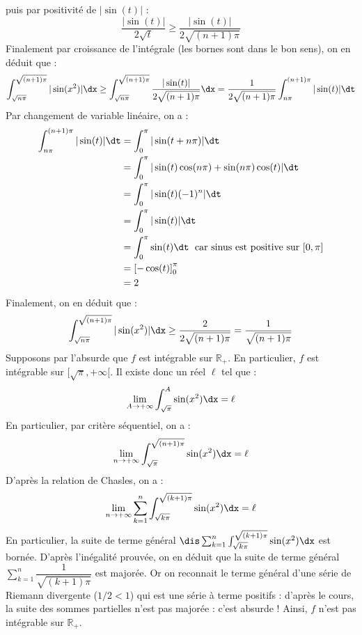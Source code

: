 \documentclass[a4paper,10pt]{report}
\begin{document}
\begin{enumerate}
puis par positivité de $\vert \sin(t) \vert$ :
$$ \dfrac{\vert \sin(t) \vert}{2 \sqrt{t}} \geq \dfrac{\vert \sin(t) \vert}{2 \sqrt{(n+1)\pi}}$$
Finalement par croissance de l'intégrale (les bornes sont dans le bon sens), on en déduit que :
$$ \int_{\sqrt{n \pi}}^{\sqrt{(n+1)\pi}} \vert \sin(x^2) \vert \dx \geq \int_{\sqrt{n \pi}}^{\sqrt{(n+1)\pi}} \dfrac{\vert \sin(t) \vert}{2 \sqrt{(n+1)\pi}} \dx = \dfrac{1}{2 \sqrt{(n+1)\pi}} \int_{n\pi}^{(n+1) \pi} \vert \sin(t) \vert \dt$$
Par changement de variable linéaire, on a : 
\begin{align*}
 \int_{n\pi}^{(n+1) \pi} \vert \sin(t) \vert \dt & =  \int_{0}^{\pi} \vert \sin(t+n \pi) \vert \dt\\
 & = \int_{0}^{\pi} \vert \sin(t) \cos(n \pi)+ \sin(n\pi)\cos(t) \vert \dt \\
 & =  \int_{0}^{\pi} \vert \sin(t) (-1)^n  \vert \dt \\
 & = \int_{0}^{\pi} \vert \sin(t)  \vert \dt \\
 & = \int_{0}^{\pi}  \sin(t)   \dt  \; \hbox{ car sinus est positive sur } [0,\pi] \\
 & = \left[- \cos(t) \right]_0^{\pi} \\
 & = 2
\end{align*}
Finalement, on en déduit que :
$$ \int_{\sqrt{n \pi}}^{\sqrt{(n+1)\pi}} \vert \sin(x^2) \vert \dx \geq \dfrac{2}{2 \sqrt{(n+1)\pi}} = \dfrac{1}{\sqrt{(n+1)\pi}}$$
Supposons par l'absurde que $f$ est intégrable sur $\mathbb{R}_+$. En particulier, $f$ est intégrable sur $[\sqrt{\pi}, + \infty[$. Il existe donc un réel $\ell$ tel que :
 $$ \lim_{A \rightarrow + \infty} \int_{\sqrt{\pi}}^A \sin(x^2) \dx = \ell$$
 En particulier, par critère séquentiel, on a :
 $$ \lim_{n \rightarrow + \infty} \int_{\sqrt{\pi}}^{\sqrt{(n+1)\pi}} \sin(x^2) \dx = \ell$$
 D'après la relation de Chasles, on a :
 $$ \lim_{n \rightarrow + \infty} \sum_{k=1}^n \int_{\sqrt{k\pi}}^{\sqrt{(k+1)\pi}} \sin(x^2) \dx = \ell$$
 En particulier, la suite de terme général $\dis \sum_{k=1}^n \int_{\sqrt{k\pi}}^{\sqrt{(k+1)\pi}} \sin(x^2) \dx$ est bornée. D'après l'inégalité prouvée, on en déduit que la suite de terme général $\sum_{k=1}^n \dfrac{1}{\sqrt{(k+1)\pi}}$ est majorée. Or on reconnait le terme général d'une série de Riemann divergente ($1/2<1$) qui est une série à terme positifs : d'après le cours, la suite des sommes partielles n'est pas majorée : c'est absurde ! Ainsi, $f$ n'est pas intégrable sur $\mathbb{R}_+$.
  \end{enumerate}

 
\medskip
\end{document}
